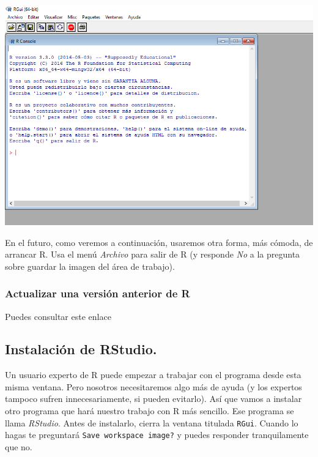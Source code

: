 \documentclass[10pt,a4paper]{article}\usepackage[]{graphicx}\usepackage[]{color}
\newcounter {cont01}
\begin{document}
    \begin{center}
    \includegraphics[width=15cm]{../fig/Tut00-39.png}
    \end{center}
En el futuro, como veremos a continuación, usaremos otra forma, más cómoda, de arrancar R. Usa el menú {\em Archivo} para salir de R (y responde {\em No} a la pregunta sobre guardar la imagen del área de trabajo).

\subsubsection*{Actualizar una versión anterior de R}

Puedes consultar este enlace
\begin{center}
\end{center}

\subsection{Instalación de RStudio.}

Un usuario experto de R puede empezar a trabajar con el programa desde esta misma ventana. Pero
nosotros necesitaremos algo más de ayuda (y los expertos tampoco sufren innecesariamente, si pueden
evitarlo). Así que vamos a instalar otro programa que hará nuestro trabajo con R más sencillo. Ese
programa se llama {\em RStudio}. Antes de instalarlo, cierra la ventana titulada {\tt RGui}. Cuando
lo hagas te preguntará {\tt Save workspace image?} y puedes responder tranquilamente que no.
\end{document}
